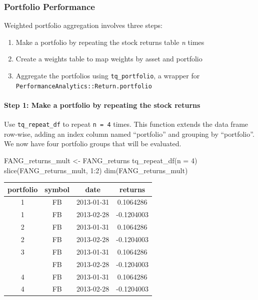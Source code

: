 \subsubsection{Portfolio Performance}\label{portfolio-performance}

Weighted portfolio aggregation involves three steps:

\begin{enumerate}
\def\labelenumi{\arabic{enumi}.}
\tightlist
\item
  Make a portfolio by repeating the stock returns table \emph{n} times
\item
  Create a weights table to map weights by asset and portfolio
\item
  Aggregate the portfolios using \texttt{tq\_portfolio}, a wrapper for
  \texttt{PerformanceAnalytics::Return.portfolio}
\end{enumerate}

\paragraph{Step 1: Make a portfolio by repeating the stock
returns}\label{step-1-make-a-portfolio-by-repeating-the-stock-returns}

Use \texttt{tq\_repeat\_df} to repeat \texttt{n\ =\ 4} times. This
function extends the data frame row-wise, adding an index column named
``portfolio'' and grouping by ``portfolio''. We now have four portfolio
groups that will be evaluated.

\begin{Schunk}
\begin{Sinput}
FANG_returns_mult <- FANG_returns %
    tq_repeat_df(n = 4)
slice(FANG_returns_mult, 1:2)
dim(FANG_returns_mult)
\end{Sinput}
\end{Schunk}

\begin{tabular}{cccc}
\toprule
portfolio & symbol & date & returns\\
\midrule
1 & FB & 2013-01-31 & 0.1064286\\
1 & FB & 2013-02-28 & -0.1204003\\
2 & FB & 2013-01-31 & 0.1064286\\
2 & FB & 2013-02-28 & -0.1204003\\
3 & FB & 2013-01-31 & 0.1064286\\
\addlinespace
3 & FB & 2013-02-28 & -0.1204003\\
4 & FB & 2013-01-31 & 0.1064286\\
4 & FB & 2013-02-28 & -0.1204003\\
\bottomrule
\end{tabular}

